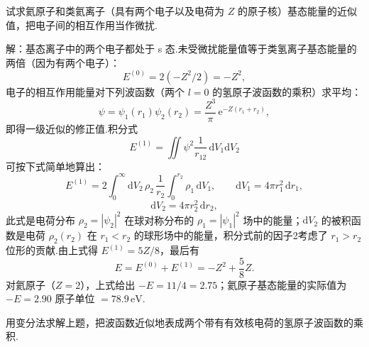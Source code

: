 \begin{xiti}

\quad 试求氦原子和类氦离子（具有两个电子以及电荷为 $Z$ 的原子核）基态能量的近似值，把电子间的相互作用当作微扰.

解：基态离子中的两个电子都处于 s 态.未受微扰能量值等于类氢离子基态能量的两倍（因为有两个电子）：
\begin{equation*}
  E^{(0)}=2(-Z^{2}/2)=-Z^{2},
\end{equation*}
电子的相互作用能量对下列波函数（两个 $l=0$ 的氢原子波函数的乘积）求平均：
\setcounter{equation}{0}\renewcommand{\theequation}{\arabic{equation}}%
\begin{equation}
  \psi=\psi_1(r_1)\psi_2(r_2)=\frac{Z^{3}}{\pi}\,\mathrm{e}^{-Z(r_1+r_2)},
\end{equation}
即得一级近似的修正值.积分式
\begin{equation*}
  E^{(1)}=\iint\psi^{2}\frac{1}{r_{12}}\,\mathrm{d}V_1\mathrm{d}V_2
\end{equation*}
可按下式简单地算出：
\begin{equation*}
  E^{(1)}=2\int_0^{\infty}\mathrm{d}V_2\,\rho_2\,\frac{1}{r_2}\int_0^{r_2}\rho_1\,\mathrm{d}V_1,
  \qquad \mathrm{d}V_1=4\pi r_1^{2}\,\mathrm{d}r_1,
\end{equation*}
\begin{equation*}
  \mathrm{d}V_2=4\pi r_2^{2}\,\mathrm{d}r_2,
\end{equation*}
此式是电荷分布 $\rho_2=|\psi_2|^{2}$ 在球对称分布的 $\rho_1=|\psi_1|^{2}$ 场中的能量；$\mathrm{d}V_2$ 的被积函数是电荷 $\rho_2(r_2)$ 在 $r_1<r_2$ 的球形场中的能量，积分式前的因子2考虑了 $r_1>r_2$ 位形的贡献.由上式得 $E^{(1)}=5Z/8$，最后有
\begin{equation*}
  E=E^{(0)}+E^{(1)}=-Z^{2}+\frac{5}{8}Z.
\end{equation*}
对氦原子（$Z=2$），上式给出 $-E=11/4=2.75$；氦原子基态能量的实际值为 $-E=2.90$ 原子单位 $=78.9\,\mathrm{eV}$.

\quad 用变分法求解上题，把波函数近似地表成两个带有有效核电荷的氢原子波函数的乘积.


\end{xiti}
